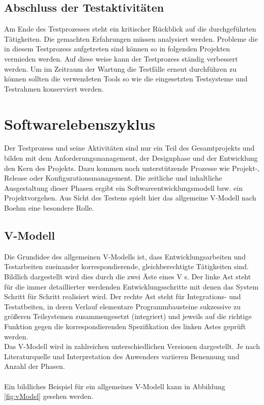 \subsection{Abschluss der Testaktivitäten}
\label{subsec:abschluss_der_testaktivitäten}
Am Ende des Testprozesses steht ein kritischer Rückblick auf die durchgeführten Tätigkeiten. Die gemachten Erfahrungen müssen analysiert werden. Probleme die in diesem Testprozess aufgetreten sind können so in folgenden Projekten vermieden werden.
Auf diese weise kann der Testprozess ständig verbessert werden.
Um im Zeitraum der Wartung die Testfälle erneut durchführen zu können sollten die verwendeten Tools so wie die eingesetzten Testsysteme und Testrahmen konserviert werden.


\section{Softwarelebenszyklus}
\label{sec:softwarelebenszyklus}
Der Testprozess und seine Aktivitäten sind nur ein Teil des Gesamtprojekts und bilden mit dem Anforderungsmanagement, der Designphase und der Entwicklung den Kern des Projekts. Dazu kommen noch unterstützende Prozesse wie Projekt-, Release oder Konfigurationsmanagement. Die zeitliche und inhaltliche Ausgestaltung dieser Phasen ergibt ein Softwareentwicklungsmodell bzw. ein Projektvorgehen. \cite{seidl_basiswissen_2012}
Aus Sicht des Testens spielt hier das allgemeine V-Modell nach Boehm eine besondere Rolle.


\subsection{V-Modell}
\label{subsec:vmodell}
Die Grundidee des allgemeinen V-Modells ist, dass Entwicklungsarbeiten und Testarbeiten zueinander korrespondierende, gleichberechtigte Tätigkeiten sind. Bildlich dargestellt wird dies durch die zwei Äste eines \glqq V \grqq s.
Der linke Ast steht für die immer detaillierter werdenden Entwicklungsschritte mit denen das System Schritt für Schritt realisiert wird. Der rechte Ast steht für Integrations- und Testatbeiten, in deren Verlauf elementare Programmbausteine sukzessive zu größeren Teilsystemen zusammengesetzt (integriert) und jeweils auf  die richtige Funktion gegen die korrespondierenden Spezifikation des linken Astes geprüft werden.
\cite{spillner_basiswissen_2007} \\
Das V-Modell wird in zahlreichen unterschiedlichen Versionen dargestellt. 
Je nach Literaturquelle und Interpretation des Anwenders variieren Benennung und Anzahl der Phasen.
\\ \\
Ein bildliches Beispiel für ein allgemeines V-Modell kann in Abbildung \ref{fig:vModel} gesehen werden.\\

